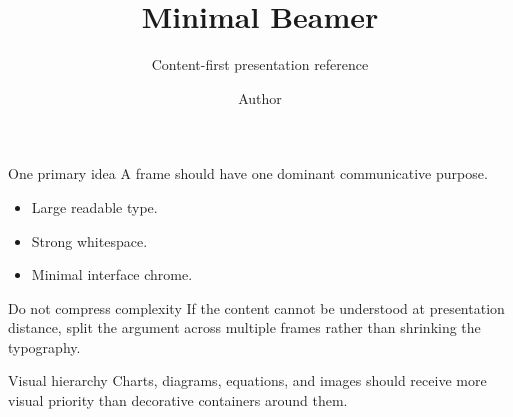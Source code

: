 \documentclass[aspectratio=169]{beamer}
\title{Minimal Beamer}
\subtitle{Content-first presentation reference}
\author{Author}
\date{}
\begin{document}
\begin{frame}[plain]
  \titlepage
\end{frame}

\begin{frame}{One primary idea}
  A frame should have one dominant communicative purpose.

  \vspace{1em}
  \begin{itemize}
    \item Large readable type.
    \item Strong whitespace.
    \item Minimal interface chrome.
  \end{itemize}
\end{frame}

\begin{frame}{Do not compress complexity}
  If the content cannot be understood at presentation distance, split the argument across
  multiple frames rather than shrinking the typography.
\end{frame}

\begin{frame}{Visual hierarchy}
  Charts, diagrams, equations, and images should receive more visual priority than
  decorative containers around them.
\end{frame}
\end{document}
